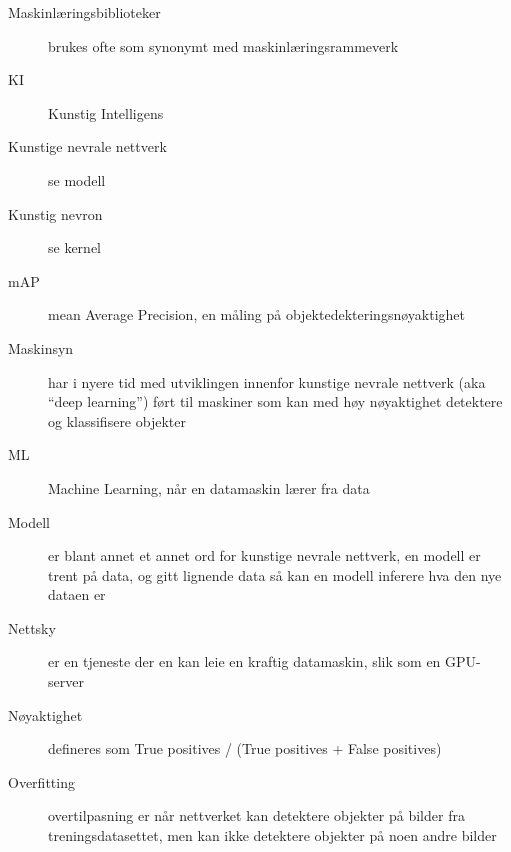 \begin{description}
\item[Maskinlæringsbiblioteker] brukes ofte som synonymt med maskinlæringsrammeverk
\item[KI] Kunstig Intelligens
\item[Kunstige nevrale nettverk] se modell
\item[Kunstig nevron] se kernel
\item[mAP] mean Average Precision, en måling på objektedekteringsnøyaktighet
\item[Maskinsyn] har i nyere tid med utviklingen innenfor kunstige nevrale nettverk (aka “deep learning”) ført til maskiner som kan med høy nøyaktighet detektere og klassifisere objekter%
\item[ML] Machine Learning, når en datamaskin lærer fra data
\item[Modell] er blant annet et annet ord for kunstige nevrale nettverk, en modell er trent på data, og gitt lignende data så kan en modell inferere hva den nye dataen er 
\item[Nettsky] er en tjeneste der en kan leie en kraftig datamaskin, slik som en GPU-server
\item[Nøyaktighet] defineres som True positives / (True positives + False positives)
\item[Overfitting] overtilpasning er når nettverket kan detektere objekter på bilder fra treningsdatasettet, men kan ikke detektere objekter på noen andre bilder

\end{description}
